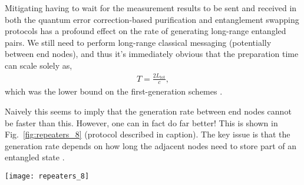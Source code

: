 Mitigating having to wait for the measurement results to be sent and received in both the quantum error correction-based purification and entanglement swapping protocols has a profound effect on the rate of generating long-range entangled pairs. We still need to perform long-range classical messaging (potentially between end nodes), and thus it's immediately obvious that the preparation time can scale solely as,
\begin{align}
	T = \frac{2 L_\mathrm{tot}}{c},
\end{align}
which was the lower bound on the first-generation schemes \cite{bib:munro10}.

Naively this seems to imply that the generation rate between end nodes cannot be faster than this. However, one can in fact do far better! This is shown in Fig.~\ref{fig:repeaters_8} (protocol described in caption). The key issue is that the generation rate depends on how long the adjacent nodes need to store part of an entangled state \cite{bib:jiang09, bib:munro10, bib:Muralidharan2016}. 

\begin{figure*}[!htbp]
\texttt{[image: repeaters\_8]}
\captionspacefig \caption{A butterfly design quantum repeater network protocol that reduces the requirements on all the quantum memory times to only that associated with the signalling time between adjacent repeater nodes \cite{bib:munro10}. Enough pairs must be generated between the node to ensure that we can use them in the error correction code in a single round trip time between adjacent nodes. The scheme relies on multiple entangled pairs being generated temporally, starting from the mid point of the network. The protocol begins with the central node creating links to both the left and right nearest neighbour nodes in sufficient number to allow an error correction code to be implemented. Once they are created the error correction circuits are applied to the links left and right of this central node (effectively creating encoded logical links). Entanglement swapping at the middle node is then applied  between these logical links, creating a logical link between the left and right adjacent nodes. The left and right nodes can then do the same to their next adjacent repeater nodes, error correcting as they go, until the desired end-to-end entangled link is achieved.}
\label{fig:repeaters_8}
\end{figure*} 

